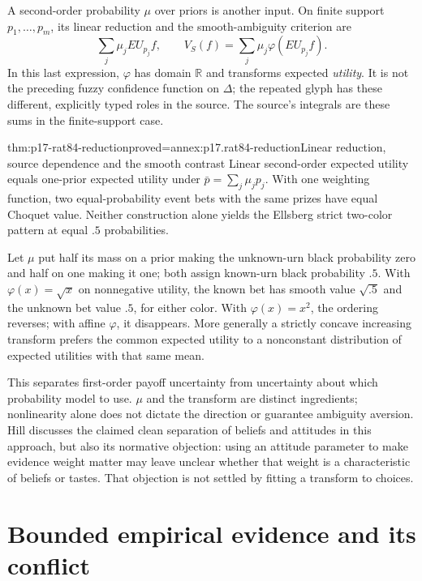 A second-order probability \(\mu\) over priors is another input. On
finite support \(p_1,\ldots,p_m\), its linear reduction and the
smooth-ambiguity criterion are
\[
 \sum_j\mu_j EU_{p_j}f,
 \qquad V_S(f)=\sum_j\mu_j\varphi(EU_{p_j}f).
\]
In this last expression, \(\varphi\) has domain \(\mathbb R\)
and transforms expected \emph{utility}. It is not the preceding
fuzzy confidence function on \(\Delta\); the repeated glyph
has these different, explicitly typed roles in the source.
The source's integrals are these sums in the finite-support case.

\begin{hbtheorem}{thm:p17-rat84-reduction}{proved=annex:p17.rat84-reduction}{Linear reduction, source dependence and the smooth contrast}
Linear second-order expected utility equals one-prior expected utility
under \(\bar p=\sum_j\mu_jp_j\). With one weighting function,
two equal-probability event bets with the same prizes have equal
Choquet value. Neither construction alone yields the Ellsberg strict
two-color pattern at equal \(.5\) probabilities.

Let \(\mu\) put half its mass on a prior making the unknown-urn
black probability zero and half on one making it one; both assign
known-urn black probability \(.5\). With \(\varphi(x)=\sqrt{x}\)
on nonnegative utility, the known bet has smooth value
\(\sqrt{.5}\) and the unknown bet value \(.5\), for either color.
With \(\varphi(x)=x^2\), the ordering reverses; with affine
\(\varphi\), it disappears. More generally a strictly concave
increasing transform prefers the common expected utility to a
nonconstant distribution of expected utilities with that same mean.
\end{hbtheorem}

This separates first-order payoff uncertainty from uncertainty about
which probability model to use. \(\mu\) and the transform are distinct
ingredients; nonlinearity alone does not dictate the direction or
guarantee ambiguity aversion. Hill discusses the claimed clean separation
of beliefs and attitudes in this approach, but also its normative objection:
using an attitude parameter to make evidence weight matter may leave
unclear whether that weight is a characteristic of beliefs or tastes.
That objection is not settled by fitting a transform to choices.
\cite[Sec.~5 and note~10, pp.~502--503]{Hill2021DecisionUncertainty}

\section{Bounded empirical evidence and its conflict}
\label{sec:p17-rat84-evidence}

